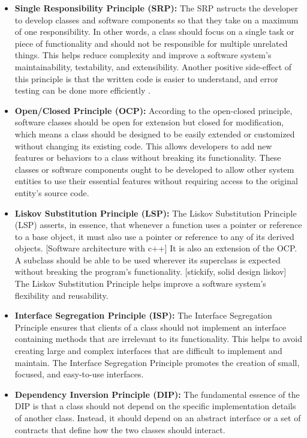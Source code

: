 \begin{itemize}
	\item \textbf{Single Responsibility Principle (SRP):}
	The SRP nstructs the developer to develop classes and software components so that they take on a maximum of one responsibility. In other words, a class should focus on a single task or piece of functionality and should not be responsible for multiple unrelated things. This helps reduce complexity and improve a software system's maintainability, testability, and extensibility. Another positive side-effect of this principle is that the written code is easier to understand, and error testing can be done more efficiently \cite{.martin}.
	
	\item \textbf{Open/Closed Principle (OCP):}
	According to the open-closed principle, software classes should be open for extension but closed for modification, which means a class should be designed to be easily extended or customized without changing its existing code. This allows developers to add new features or behaviors to a class without breaking its functionality. These classes or software components ought to be developed to allow other system entities to use their essential features without requiring access to the original entity's source code. 
	
	\item \textbf{Liskov Substitution Principle (LSP):}
	The Liskov Substitution Principle (LSP) asserts, in essence, that whenever a function uses a pointer or reference to a base object, it must also use a pointer or reference to any of its derived objects. [Software architecture with c++] It is also an extension of the OCP. A subclass should be able to be used wherever its superclass is expected without breaking the program's functionality. [stickify, solid design liskov] The Liskov Substitution Principle helps improve a software system's flexibility and reusability.
	
	\item \textbf{Interface Segregation Principle (ISP):}
	The Interface Segregation Principle ensures that clients of a class should not implement an interface containing methods that are irrelevant to its functionality. This helps to avoid creating large and complex interfaces that are difficult to implement and maintain. The Interface Segregation Principle promotes the creation of small, focused, and easy-to-use interfaces. 
	
	\item \textbf{Dependency Inversion Principle (DIP):}
	The fundamental essence of the DIP is that a class should not depend on the specific implementation details of another class. Instead, it should depend on an abstract interface or a set of contracts that define how the two classes should interact.
\end{itemize}

